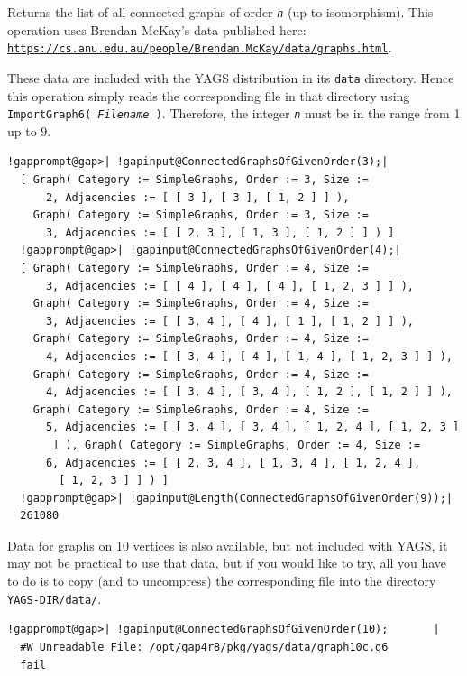 \documentclass[a4paper,11pt]{report}
\begin{document}
{{{ 

Returns the list of all connected graphs of order \mbox{\texttt{\mdseries\slshape n}} (up to isomorphism). This operation uses Brendan McKay's data published here: \href{https://cs.anu.edu.au/people/Brendan.McKay/data/graphs.html} {\texttt{https://cs.anu.edu.au/people/Brendan.McKay/data/graphs.html}}. 

These data are included with the \textsf{YAGS} distribution in its \texttt{data} directory. Hence this operation simply reads the corresponding file in that
directory using \texttt{ImportGraph6( \mbox{\texttt{\mdseries\slshape Filename}} )}. Therefore, the integer \mbox{\texttt{\mdseries\slshape n}} must be in the range from 1 up to 9. 


\begin{Verbatim}[commandchars=!@|,fontsize=\small,frame=single,label=Example]
  !gapprompt@gap>| !gapinput@ConnectedGraphsOfGivenOrder(3);|
  [ Graph( Category := SimpleGraphs, Order := 3, Size := 
      2, Adjacencies := [ [ 3 ], [ 3 ], [ 1, 2 ] ] ), 
    Graph( Category := SimpleGraphs, Order := 3, Size := 
      3, Adjacencies := [ [ 2, 3 ], [ 1, 3 ], [ 1, 2 ] ] ) ]
  !gapprompt@gap>| !gapinput@ConnectedGraphsOfGivenOrder(4);|
  [ Graph( Category := SimpleGraphs, Order := 4, Size := 
      3, Adjacencies := [ [ 4 ], [ 4 ], [ 4 ], [ 1, 2, 3 ] ] ), 
    Graph( Category := SimpleGraphs, Order := 4, Size := 
      3, Adjacencies := [ [ 3, 4 ], [ 4 ], [ 1 ], [ 1, 2 ] ] ), 
    Graph( Category := SimpleGraphs, Order := 4, Size := 
      4, Adjacencies := [ [ 3, 4 ], [ 4 ], [ 1, 4 ], [ 1, 2, 3 ] ] ), 
    Graph( Category := SimpleGraphs, Order := 4, Size := 
      4, Adjacencies := [ [ 3, 4 ], [ 3, 4 ], [ 1, 2 ], [ 1, 2 ] ] ), 
    Graph( Category := SimpleGraphs, Order := 4, Size := 
      5, Adjacencies := [ [ 3, 4 ], [ 3, 4 ], [ 1, 2, 4 ], [ 1, 2, 3 ] 
       ] ), Graph( Category := SimpleGraphs, Order := 4, Size := 
      6, Adjacencies := [ [ 2, 3, 4 ], [ 1, 3, 4 ], [ 1, 2, 4 ], 
        [ 1, 2, 3 ] ] ) ]
  !gapprompt@gap>| !gapinput@Length(ConnectedGraphsOfGivenOrder(9));|
  261080
\end{Verbatim}
 

Data for graphs on 10 vertices is also available, but not included with \textsf{YAGS}, it may not be practical to use that data, but if you would like to try, all
you have to do is to copy (and to uncompress) the corresponding file into the
directory \texttt{YAGS-DIR/data/}. 

 
\begin{Verbatim}[commandchars=!@|,fontsize=\small,frame=single,label=Example]
  !gapprompt@gap>| !gapinput@ConnectedGraphsOfGivenOrder(10);       |
  #W Unreadable File: /opt/gap4r8/pkg/yags/data/graph10c.g6
  fail
\end{Verbatim}
 }

}}
\end{document}

